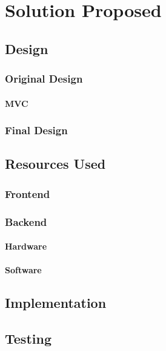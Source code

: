\chapter{Solution Proposed}\label{chap:4}

\section{Design}\label{sec:chap4_des}

\subsection{Original Design}\label{sec:chap4_ori_des}

\subsubsection{MVC}\label{sec:chap4_ori_mvc}

\subsection{Final Design}\label{sec:chap4_fin_des}


\section{Resources Used}\label{sec:chap4_res_used}

\subsection{Frontend}\label{sec:chap4_res_front}

\subsection{Backend}\label{sec:chap4_res_back}

\subsubsection{Hardware}\label{sec:chap4_back_hard}

\subsubsection{Software}\label{sec:chap4_back_soft}

\section{Implementation}\label{sec:chap4_impl}

\section{Testing}\label{sec:chap4_test}



